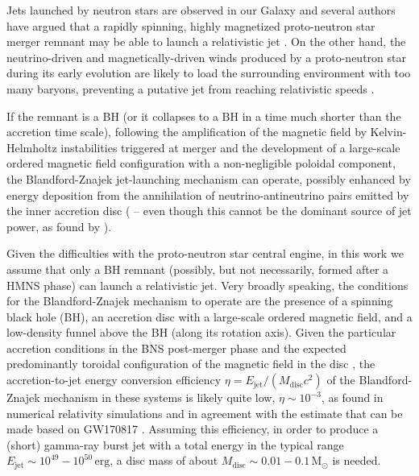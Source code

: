 \documentclass[]{aa}
\newcommand{\resp}[1]{#1}
\begin{document}
Jets launched by neutron stars are observed in our Galaxy \citep[e.g.][]{Pavan2014,VanDenEijnden2018} and several authors have argued that a rapidly spinning, highly magnetized proto-neutron star merger remnant may be able to launch a relativistic jet \citep[e.g.][]{Usov1992,Thompson1994,Thompson2004,Metzger2011,Mosta2020}. On the other hand, the neutrino-driven \citep{Dessart2009,Perego2014} and magnetically-driven \citep{Ciolfi2020_winds} winds produced by a proto-neutron star during its early evolution are likely to load the surrounding environment with too many baryons, preventing a putative jet from reaching relativistic speeds \citep[e.g.][]{Ciolfi2020_nomagnetar}.

If the remnant is a BH (or it collapses to a BH in a time much shorter than the accretion time scale), following the amplification of the magnetic field by Kelvin-Helmholtz instabilities triggered at merger \citep{Obergaulinger2010,Kiuchi2015,Aguilera-Miret2020} \resp{and the development of a large-scale ordered magnetic field configuration with a non-negligible poloidal component}, the Blandford-Znajek jet-launching mechanism \citep{Blandford1977,Komissarov2001,Tchekhovskoy2010} can operate, possibly enhanced by energy deposition from the annihilation of neutrino-antineutrino pairs emitted by the inner accretion disc (\citealt{Eichler1989} -- even though this cannot be the dominant source of jet power, as found by \citealt{Just2016}).

Given the difficulties with the proto-neutron star central engine, in this work we assume that only a BH remnant (possibly, but not necessarily, formed after a HMNS phase) can launch a relativistic jet. Very broadly speaking, the conditions for the Blandford-Znajek mechanism to operate are the presence of a spinning black hole (BH), \resp{an accretion disc with a large-scale ordered magnetic field}, and a low-density funnel above the BH (along its rotation axis). Given the particular accretion conditions in the BNS post-merger phase and the expected predominantly toroidal configuration of the magnetic field in the disc \citep{Kiuchi2014,Kawamura2016}, the accretion-to-jet energy conversion efficiency $\eta = E_\mathrm{jet}/(M_\mathrm{disc}c^2)$ of the Blandford-Znajek mechanism in these systems \citep{Christie2019} is likely quite low, $\eta\sim 10^{-3}$, as found in numerical relativity simulations \citep{Ruiz2018} and in agreement with the estimate that can be made based on GW170817 \citep{Salafia2021}. Assuming this efficiency, in order to produce a (short) gamma-ray burst jet with a \resp{total} energy in the typical \citep{Fong2015} range $E_\mathrm{jet}\sim 10^{49}-10^{50}\,\mathrm{erg}$, a disc mass of about $M_\mathrm{disc}\sim 0.01-0.1\,\mathrm{M_\odot}$ is needed. 
\end{document}
